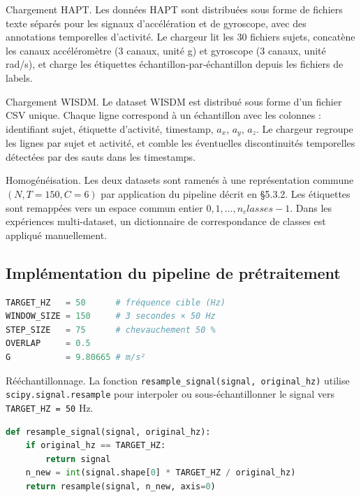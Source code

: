 Chargement HAPT. Les données HAPT sont distribuées sous forme de fichiers texte séparés pour les signaux d'accélération et de gyroscope, avec des annotations temporelles d'activité. Le chargeur lit les 30 fichiers sujets, concatène les canaux accéléromètre (3 canaux, unité g) et gyroscope (3 canaux, unité rad/s), et charge les étiquettes échantillon-par-échantillon depuis les fichiers de labels.

Chargement WISDM. Le dataset WISDM est distribué sous forme d'un fichier CSV unique. Chaque ligne correspond à un échantillon avec les colonnes : identifiant sujet, étiquette d'activité, timestamp, $a_x$, $a_y$, $a_z$. Le chargeur regroupe les lignes par sujet et activité, et comble les éventuelles discontinuités temporelles détectées par des sauts dans les timestamps.

Homogénéisation. Les deux datasets sont ramenés à une représentation commune $(N, T=150, C=6)$ par application du pipeline décrit en §5.3.2. Les étiquettes sont remappées vers un espace commun entier ${0, 1, \ldots, n_classes-1}$. Dans les expériences multi-dataset, un dictionnaire de correspondance de classes est appliqué manuellement.

\subsection{Implémentation du pipeline de prétraitement}

\begin{lstlisting}[language=Python,caption={Constantes globales du prétraitement (\texttt{preprocessing.py})},label=lst:preproc_const]
TARGET_HZ   = 50      # fréquence cible (Hz)
WINDOW_SIZE = 150     # 3 secondes × 50 Hz
STEP_SIZE   = 75      # chevauchement 50 %
OVERLAP     = 0.5
G           = 9.80665 # m/s²
\end{lstlisting}

Rééchantillonnage. La fonction \texttt{resample\_signal(signal, original\_hz)} utilise \texttt{scipy.signal.resample} pour interpoler ou sous-échantillonner le signal vers \texttt{TARGET\_HZ = 50} Hz.

\begin{lstlisting}[language=Python,caption={Rééchantillonnage à 50 Hz},label=lst:resample]
def resample_signal(signal, original_hz):
    if original_hz == TARGET_HZ:
        return signal
    n_new = int(signal.shape[0] * TARGET_HZ / original_hz)
    return resample(signal, n_new, axis=0)
\end{lstlisting}

